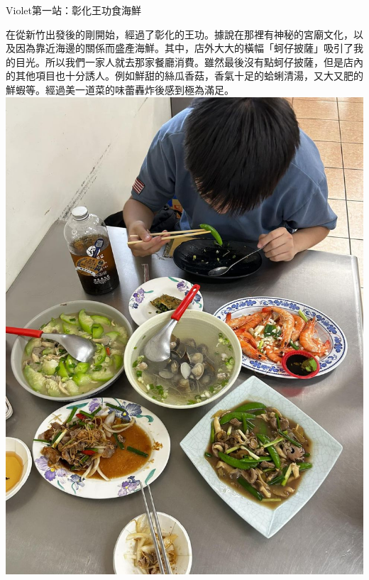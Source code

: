 \documentclass{article}
\begin{document}

\begin{large}
\begin{boxpar}{Violet}{第一站：彰化王功食海鮮}
  \begin{tcolorbox}[sidebyside, righthand width=0.25\textwidth, colback=Violet!50!white, colframe=Violet]
    在從新竹出發後的剛開始，經過了彰化的王功。據說在那裡有神秘的宮廟文化，以及因為靠近海邊的關係而盛產海鮮。其中，店外大大的橫幅「蚵仔披薩」吸引了我的目光。所以我們一家人就去那家餐廳消費。雖然最後沒有點蚵仔披薩，但是店內的其他項目也十分誘人。例如鮮甜的絲瓜香菇，香氣十足的蛤蜊清湯，又大又肥的鮮蝦等。經過美一道菜的味蕾轟炸後感到極為滿足。
    \tcblower
    \centering
    \includegraphics[width=\linewidth]{seafood.jpg}
  \end{tcolorbox}
  \begin{tcolorbox}[sidebyside, lefthand width=0.25\textwidth, colback=Violet!50!white, colframe=Violet]

\end{tcolorbox}
\end{boxpar}
\end{large}
\end{document}
